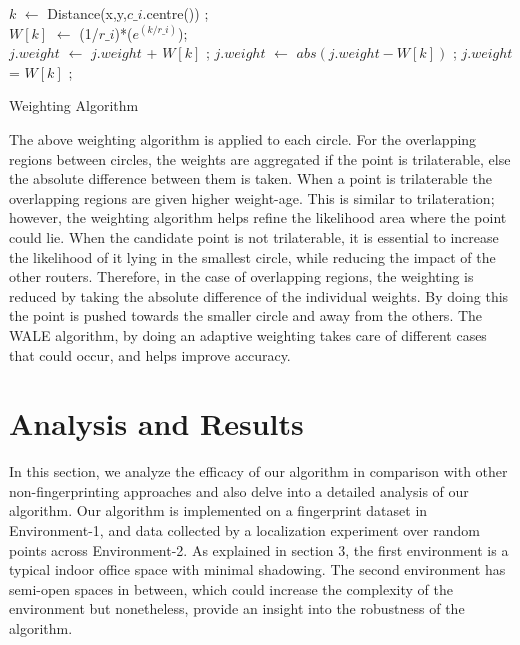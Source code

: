 \documentclass[twocolumn]{svjour3}
\begin{document}
\begin{algorithm}[!ht]
\SetAlgoLined
{}
{
    {
        $k$ $\leftarrow$ Distance(x,y,$c\_i$.centre()) ;\\
        $W[k]$ $\leftarrow$ (1/$r\_i$)*($e^{(k/r\_i)}$);\\
        {   
            {
                {
                    $j.weight$ $\leftarrow$ $j.weight$ + $W[k]$ ;
                }
                \Else
                {
                    $j.weight$ $\leftarrow$ $abs(j.weight - W[k])$ ;
                }
            }
            \Else
            {
                $j.weight$ = $W[k]$ ;
            }
        }
    }
}
\caption{Weighting Algorithm}
\label{Adaptive Weighting}
\end{algorithm}

The above weighting algorithm is applied to each circle. For the overlapping regions between circles, the weights are aggregated if the point is trilaterable, else the absolute difference between them is taken. When a point is trilaterable the overlapping regions are given higher weight-age. This is similar to trilateration; however, the weighting algorithm helps refine the likelihood area where the point could lie. When the candidate point is not trilaterable, it is essential to increase the likelihood of it lying in the smallest circle, while reducing the impact of the other routers. Therefore, in the case of overlapping regions, the weighting is reduced by taking the absolute difference of the individual weights. By doing this the point is pushed towards the smaller circle and away from the others. The WALE algorithm, by doing an adaptive weighting takes care of different cases that could occur, and helps improve accuracy.

\section{\textbf{Analysis and Results}}

In this section, we analyze the efficacy of our algorithm in comparison with other non-fingerprinting approaches and also delve into a detailed analysis of our algorithm. Our algorithm is implemented on a fingerprint dataset in Environment-1, and data collected by a localization experiment over random points across Environment-2. As explained in section 3, the first environment is a typical indoor office space with minimal shadowing. The second environment has semi-open spaces in between, which could increase the complexity of the environment but nonetheless, provide an insight into the robustness of the algorithm.
\end{document}
